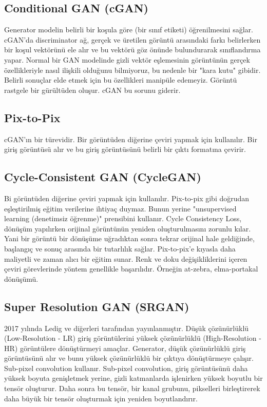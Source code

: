 \newpage

\subsection{Conditional GAN (cGAN)}
Generator modelin belirli bir koşula göre (bir sınıf etiketi) öğrenilmesini sağlar. cGAN'da discriminator ağ, gerçek ve üretilen görüntü arasındaki farkı belirlerken bir koşul vektörünü ele alır ve bu vektörü göz önünde bulundurarak sınıflandırma yapar. Normal bir GAN modelinde gizli vektör eşlemesinin görüntünün gerçek özellikleriyle nasıl ilişkili olduğunu bilmiyoruz, bu nedenle bir "kara kutu" gibidir. Belirli sonuçlar elde etmek için bu özellikleri manipüle edemeyiz. Görüntü rastgele bir gürültüden oluşur. cGAN bu sorunu giderir.

\newpage

\subsection{Pix-to-Pix}
cGAN'ın bir türevidir. Bir görüntüden diğerine çeviri yapmak için kullanılır. Bir giriş görüntüsü alır ve bu giriş görüntüsünü belirli bir çıktı formatına çevirir. 

\newpage

\subsection{Cycle-Consistent GAN (CycleGAN)}
Bi görüntüden diğerine çeviri yapmak için kullanılır. Pix-to-pix gibi doğrudan eşleştirilmiş eğitim verilerine ihtiyaç duymaz. Bunun yerine "unsupervised learning (denetimsiz öğrenme)" prensibini kullanır. Cycle Consistency Loss, dönüşüm yapılırken orijinal görüntünün yeniden oluşturulmasını zorunlu kılar. Yani bir görüntü bir dönüşüme uğradıktan sonra tekrar orijinal hale geldiğinde, başlangıç ve sonuç arasında bir tutarlılık sağlar. Pix-to-pix'e kıyasla daha maliyetli ve zaman alıcı bir eğitim sunar. Renk ve doku değişikliklerini içeren çeviri görevlerinde yöntem genellikle başarılıdır. Örneğin at-zebra, elma-portakal dönüşümü.

\newpage

\subsection{Super Resolution GAN (SRGAN)}
2017 yılında Ledig ve diğerleri tarafından yayınlanmıştır. Düşük çözünürlüklü (Low-Resolution - LR) giriş görüntülerini yüksek çözünürlüklü (High-Resolution - HR) görüntülere dönüştürmeyi amaçlar. Generator, düşük çözünürlüklü giriş görüntüsünü alır ve bunu yüksek çözünürlüklü bir çıktıya dönüştürmeye çalışır. Sub-pixel convolution kullanır. Sub-pixel convolution, giriş görüntüsünü daha yüksek boyuta genişletmek yerine, gizli katmanlarda işlenirken yüksek boyutlu bir tensör oluşturur. Daha sonra bu tensör, bir kanal grubunu, pikselleri birleştirerek daha büyük bir tensör oluşturmak için yeniden boyutlandırır.

